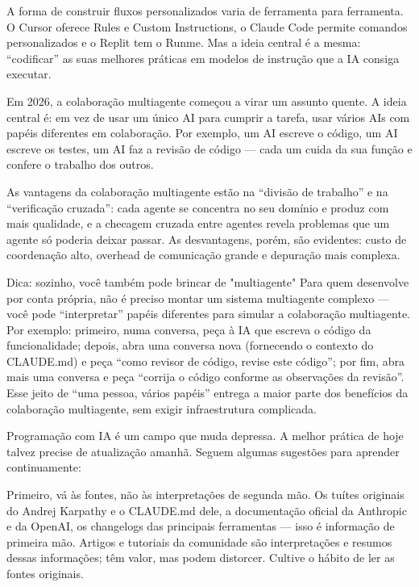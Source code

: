 A forma de construir fluxos personalizados varia de ferramenta para ferramenta. O Cursor oferece Rules e Custom Instructions, o Claude Code permite comandos personalizados e o Replit tem o Runme. Mas a ideia central é a mesma: “codificar” as suas melhores práticas em modelos de instrução que a IA consiga executar.


Em 2026, a colaboração multiagente começou a virar um assunto quente. A ideia central é: em vez de usar um único AI para cumprir a tarefa, usar vários AIs com papéis diferentes em colaboração. Por exemplo, um AI escreve o código, um AI escreve os testes, um AI faz a revisão de código — cada um cuida da sua função e confere o trabalho dos outros.

As vantagens da colaboração multiagente estão na “divisão de trabalho” e na “verificação cruzada”: cada agente se concentra no seu domínio e produz com mais qualidade, e a checagem cruzada entre agentes revela problemas que um agente só poderia deixar passar. As desvantagens, porém, são evidentes: custo de coordenação alto, overhead de comunicação grande e depuração mais complexa.

\begin{tcbinfo}{Dica: sozinho, você também pode brincar de "multiagente"}
Para quem desenvolve por conta própria, não é preciso montar um sistema multiagente complexo — você pode “interpretar” papéis diferentes para simular a colaboração multiagente. Por exemplo: primeiro, numa conversa, peça à IA que escreva o código da funcionalidade; depois, abra uma conversa nova (fornecendo o contexto do CLAUDE.md) e peça “como revisor de código, revise este código”; por fim, abra mais uma conversa e peça “corrija o código conforme as observações da revisão”. Esse jeito de “uma pessoa, vários papéis” entrega a maior parte dos benefícios da colaboração multiagente, sem exigir infraestrutura complicada.

\end{tcbinfo}


Programação com IA é um campo que muda depressa. A melhor prática de hoje talvez precise de atualização amanhã. Seguem algumas sugestões para aprender continuamente:

Primeiro, vá às fontes, não às interpretações de segunda mão. Os tuítes originais do Andrej Karpathy e o CLAUDE.md dele, a documentação oficial da Anthropic e da OpenAI, os changelogs das principais ferramentas — isso é informação de primeira mão. Artigos e tutoriais da comunidade são interpretações e resumos dessas informações; têm valor, mas podem distorcer. Cultive o hábito de ler as fontes originais.


